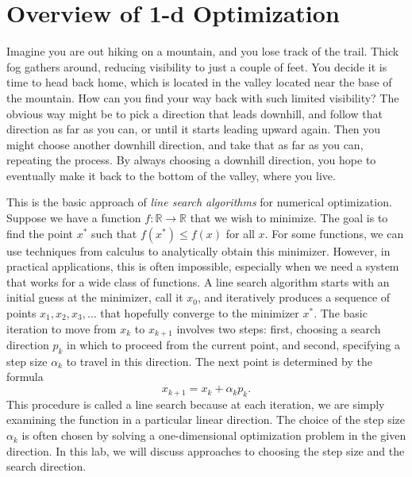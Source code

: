 \label{lab:1-dOpt}

\section*{Overview of 1-d Optimization} %

Imagine you are out hiking on a mountain, and you lose track of the trail.
Thick fog gathers around, reducing visibility to just a couple of feet.
You decide it is time to head back home, which is located in the valley located near the base of the mountain.
How can you find your way back with such limited visibility?
The obvious way might be to pick a direction that leads downhill, and follow that direction as far as you can, or until it starts leading upward again.
Then you might choose another downhill direction, and take that as far as you can, repeating the process.
By always choosing a downhill direction, you hope to eventually make it back to the bottom of the valley, where you live.

This is the basic approach of \emph{line search algorithms} for numerical optimization.
Suppose we have a function $f:\mathbb{R}\rightarrow\mathbb{R}$ that we wish to minimize.
The goal is to find the point $x^*$ such that $f(x^*) \le f(x)$ for all $x$.
For some functions, we can use techniques from calculus to analytically obtain this minimizer.
However, in practical applications, this is often impossible, especially when
we need a system that works for a wide class of functions.
A line search algorithm starts with an initial guess at the minimizer, call it $x_0$, and iteratively produces a sequence of points $x_1, x_2, x_3, \ldots$ that hopefully converge to the minimizer $x^*$.
The basic iteration to move from $x_k$ to $x_{k+1}$ involves two steps: first, choosing a search direction $p_k$ in which to proceed from the current point, and second, specifying a step size $\alpha_k$ to travel
in this direction.
The next point is determined by the formula
$$
x_{k+1} = x_k + \alpha_kp_k.
$$
This procedure is called a line search because at each iteration, we are simply examining the function in a particular linear direction.
The choice of the step size $\alpha_k$ is often chosen by solving a one-dimensional optimization problem in the given direction.
In this lab, we will discuss approaches to choosing the step size and the search direction.

